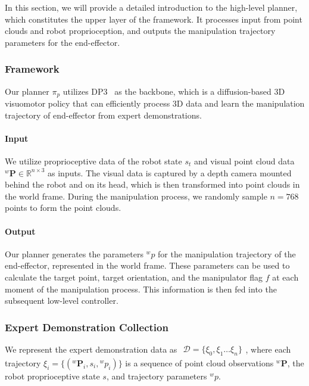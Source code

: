 \label{sec:planning}

In this section, we will provide a detailed introduction to the high-level planner, which constitutes the upper layer of the framework. It processes input from point clouds and robot proprioception, and outputs the manipulation trajectory parameters for the end-effector.

\subsubsection{Framework}
Our planner $\pi_{p}$ utilizes DP3~\cite{ze2024DP3} as the backbone, which is a diffusion-based 3D visuomotor policy that can efficiently process 3D data and learn the manipulation trajectory of end-effector from expert demonstrations.

\paragraph{Input}
 We utilize proprioceptive data of the robot state $s_{t}$ and visual point cloud data ${}^{w}\mathbf{P} \in  \mathbb{R}^{n\times 3}$ as inputs. The visual data is captured by a depth camera mounted behind the robot and on its head, which is then transformed into point clouds in the world frame. During the manipulation process, we randomly sample $n=768$ points to form the point clouds.
 
\paragraph{Output}
Our planner generates the parameters ${}^{w}p$ for the manipulation trajectory of the end-effector, represented in the world frame. These parameters can be used to calculate the target point, target orientation, and the manipulator flag $f$ at each moment of the manipulation process. This information is then fed into the subsequent low-level controller.

\subsubsection{Expert Demonstration Collection}

We represent the expert demonstration data as $\begin{aligned}\mathcal{D}=\{\xi_0,\xi_1\ldots\xi_n\}\end{aligned}$, where each trajectory $\xi_i=\{({}^{w}\mathbf{P}_i,s_i,{}^{w}p_i)\}$ is a sequence of point cloud observations ${}^{w}\mathbf{P}$, the robot proprioceptive state $s$, and trajectory parameters ${}^{w}p$.


